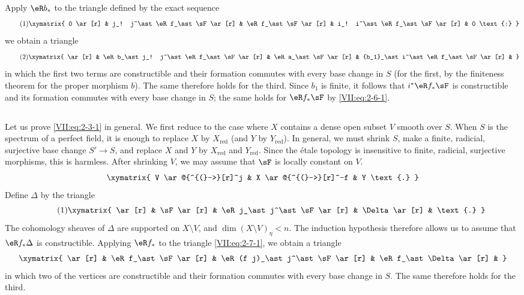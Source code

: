 \documentclass[oneside]{book}
\begin{document}
Apply $\eR b_\ast$ to the triangle defined by the exact sequence
\begin{equation*}\tag{1}\label{VII:eq:2-6-1}
\xymatrix{
  0 \ar[r] 
    & j_! j^\ast \eR f_\ast \sF \ar[r] 
    & \eR f_\ast \sF \ar[r] 
    & i_! i^\ast \eR f_\ast \sF \ar[r] 
    & 0 \text{:} 
}
\end{equation*}
we obtain a triangle
\begin{equation*}\tag{2}\label{VII:eq:2-6-2}
\xymatrix{
  \ar[r] 
    & \eR b_\ast j_! j^\ast \eR f_\ast \sF \ar[r] 
    & \eR a_\ast \sF \ar[r] 
    & {b_1}_\ast i^\ast \eR f_\ast \sF \ar[r] 
    & 
}
\end{equation*}
in which the first two terms are constructible and their formation commutes
with every base change in $S$ (for the first, by the finiteness theorem for
the proper morphism $b$). The same therefore holds for the third. Since $b_1$
is finite, it follows that $i^\ast \eR f_\ast \sF$ is constructible and its
formation commutes with every base change in $S$; the same holds for
$\eR f_\ast \sF$ by \eqref{VII:eq:2-6-1}.





\subsection{}\label{VII:2-7}

Let us prove \eqref{VII:eq:2-3-1} in general. We first reduce to the case where
$X$ contains a dense open subset $V$ smooth over $S$. When $S$ is the spectrum
of a perfect field, it is enough to replace $X$ by $X_\text{red}$ (and $Y$ by
$Y_\text{red}$). In general, we must shrink $S$, make a finite, radicial,
surjective base change $S' \to S$, and replace $X$ and $Y$ by $X_\text{red}$
and $Y_\text{red}$. Since the étale topology is insensitive to finite,
radicial, surjective morphisms, this is harmless. After shrinking $V$, we may
assume that $\sF$ is locally constant on $V$.
\[\xymatrix{
  V \ar@{^{(}->}[r]^j 
    & X \ar@{^{(}->}[r]^-f 
    & Y \text{.} 
}\]
Define $\Delta$ by the triangle
\begin{equation*}\tag{1}\label{VII:eq:2-7-1}
\xymatrix{
  \ar[r] 
    & \sF \ar[r] 
    & \eR j_\ast j^\ast \sF \ar[r] 
    & \Delta \ar[r] 
    & \text{.} 
}
\end{equation*}
The cohomology sheaves of $\Delta$ are supported on $X\setminus V$, and
$\dim(X\setminus V)_\eta < n$. The induction hypothesis therefore allows us
to assume that $\eR f_\ast \Delta$ is constructible. Applying $\eR f_\ast$ to
the triangle \eqref{VII:eq:2-7-1}, we obtain a triangle
\[\xymatrix{
  \ar[r] 
    & \eR f_\ast \sF \ar[r] 
    & \eR(f j)_\ast j^\ast \sF \ar[r] 
    & \eR f_\ast \Delta \ar[r] 
    & 
}\]
in which two of the vertices are constructible and their formation commutes
with every base change in $S$. The same therefore holds for the third.
\end{document}
